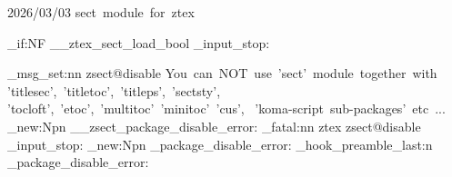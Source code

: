   {2026/03/03}{\ztex@versi@n}
  {sect~module~for~ztex}




\bool_if:NF \g__ztex_sect_load_bool 
  { \file_input_stop: }


\ztex_msg_set:nn { zsect@disable }
  {
    You~can~NOT~use~'sect'~module~together~with~
    'titlesec',~'titletoc',~'titleps',~'sectsty',~
    'tocloft',~'etoc',~'multitoc'~'minitoc'~'cus',~
    'koma-script~sub-packages'~etc~...
  }
\cs_new:Npn \__zsect_package_disable_error:
  {
    \msg_fatal:nn { ztex } { zsect@disable }
    \file_input_stop:
  }
\cs_new:Npn \zsect_package_disable_error:
  {
  }
\ztex_hook_preamble_last:n 
  {
    \zsect_package_disable_error:
  }



